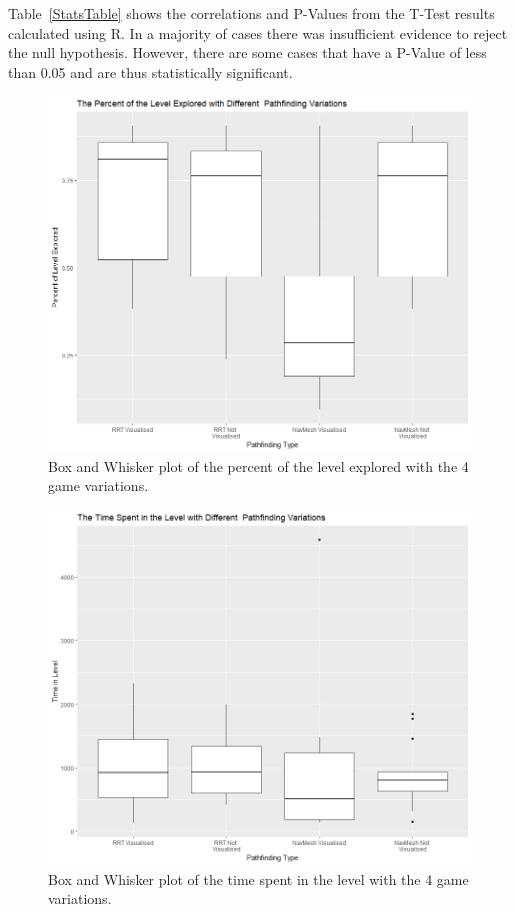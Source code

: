 \documentclass[journal]{IEEEtran}
\begin{document}
	Table~\ref{StatsTable} shows the correlations and P-Values from the T-Test results calculated using R.  In a majority of cases there was insufficient evidence to reject the null hypothesis. However, there are some cases that have a P-Value of less than 0.05 and are thus statistically significant. 
	
	\begin{figure}[h]
		\includegraphics[width=1.0\linewidth]{GraphPercent.png}
		\caption{Box and Whisker plot of the percent of the level explored with the 4 game variations.}
		\label{graph:Percent}
	\end{figure}
	
	\begin{figure}[h]
		\includegraphics[width=1.0\linewidth]{GraphTime.png}
		\caption{Box and Whisker plot of the time spent in the level with the 4 game variations.}
		\label{graph:Time}
	\end{figure}  
	
\end{document}
